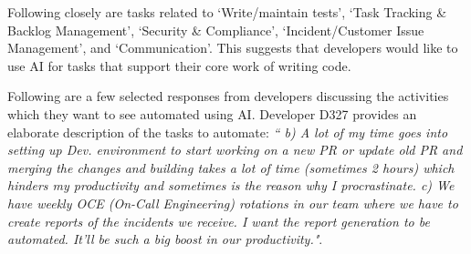  Following closely are tasks related to  `Write/maintain tests', `Task Tracking \& Backlog Management', `Security \& Compliance', `Incident/Customer Issue Management', and `Communication'. This suggests that developers would like to use AI for tasks that support their core work of writing code.

Following are a few selected responses from developers discussing the activities which they want to see automated using AI. Developer D327 provides an elaborate description of the tasks to automate: \textit{`` b) A lot of my time goes into setting up Dev. environment to start working on a new PR or update old PR and merging the changes and building takes a lot of time (sometimes 2 hours) which hinders my productivity and sometimes is the reason why I procrastinate. c) We have weekly OCE (On-Call Engineering) rotations in our team where we have to create reports of the incidents we receive. I want the report generation to be automated. It’ll be such a big boost in our productivity."}.
